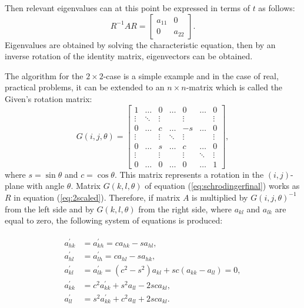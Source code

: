 \documentclass[12pt, a4paper, reqno, article]{amsart}
\begin{document}
Then relevant eigenvalues can at this point be expressed in terms of $t$ as follows:
\begin{equation}
R^{-1}AR = \begin{bmatrix}
a_{11} & 0 \\
0 & a_{22}
\end{bmatrix}.
\end{equation}
Eigenvalues are obtained by solving the characteristic equation, then by an inverse rotation of the identity matrix, eigenvectors can be obtained.

The algorithm for the $2\times2$-case is a simple example and in the case of real, practical problems, it can be extended to an $n\times n$-matrix which is called the Given's rotation matrix:
\begin{equation}
G(i,j,\theta) = \begin{bmatrix}
1 & \hdots & 0 &\hdots & 0 & \hdots & 0 \\
    \vdots & \ddots & \vdots & {} & \vdots & {} & \vdots \\
    0 & \hdots & c &\hdots & -s & \hdots & 0 \\
    \vdots & {} & \vdots & \ddots & \vdots & {} & \vdots \\
    0 & \hdots & s &\hdots & c & \hdots & 0 \\
    \vdots & {} & \vdots & {} & \vdots & \ddots & \vdots \\
0 & \hdots & 0 &\hdots & 0 & \hdots & 1
\end{bmatrix},
\end{equation}
where $s=\sin{\theta}$ and $c= \cos{\theta}$. This matrix represents a rotation in the $(i,j)$-plane with angle $\theta$. Matrix $G(k,l,\theta)$ of equation (\ref{eq:schrodingerfinal}) works as $R$ in equation (\ref{eq:2scaled}). Therefore, if matrix $A$ is multiplied by $G(i,j,\theta)^{-1}$ from the left side and by $G(k,l,\theta)$ from the right side, where $a_{kl}$ and $a_{lk}$ are equal to zero, the following system of equations is produced:

\begin{align}
\label{eq:rotation}
\begin{split}
  a^{\prime}_{hk} &= a^{\prime}_{kh} = ca_{hk} - sa_{hl}, \\
  a^{\prime}_{hl} &= a^{\prime}_{lh} = ca_{hl} - sa_{hk}, \\
  a^{\prime}_{kl} &= a^{\prime}_{lk} = (c^2 - s^2)a_{kl} + sc(a_{kk} - a_{ll}) = 0,\\
  a^{\prime}_{kk} &= c^2a^{\prime}_{kk} + s^2a_{ll} - 2sca_{kl},\\
  a^{\prime}_{ll} &= s^2a^{\prime}_{kk} + c^2a_{ll} + 2sca_{kl}.
\end{split}
\end{align}
\end{document}
